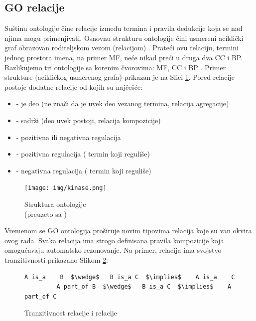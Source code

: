 \subsection{GO relacije}

Suštinu ontologije čine relacije između termina i pravila dedukcije koja se nad
njima mogu primenjivati. Osnovnu strukturu ontologije čini usmereni aciklički
graf  obrazovan roditeljskom vezom (relacijom) . Prateći
ovu relaciju, termini jednog prostora imena, na primer MF, neće nikad preći u
druga dva CC i BP. Razlikujemo tri ontologije sa korenim čvorovima:  MF, CC i BP
\parencite{go_struktura}. Primer strukture (acikličkog usmerenog grafa) prikazan je na
Slici \ref{fig:kinase}.  Pored relacije  postoje dodatne relacije od kojih
su najčešće:

\begin{itemize}
  \item {}  - je deo  (ne znači da je uvek deo vezanog termina, relacija agregacije)
  \item {} - sadrži (deo uvek postoji, relacija kompozicije)
  \item {} - pozitivna ili negativna regulacija
  \item {} - pozitivna regulacija  
    ( termin koji reguliše)
  \item {} - negativna regulacija 
    ( termin koji reguliše)
\end{itemize}

\begin{figure}[h!]
  \centering
  \texttt{[image: img/kinase.png]}
  \caption{Struktura ontologije\\ \footnotesize (preuzeto sa \parencite{go_veb})}
  \label{fig:kinase}
\end{figure}

Vremenom se GO ontologija proširuje novim tipovima relacija koje su van okvira ovog rada.
Svaka relacija ima strogo definisana pravila kompozicije koja omogućavaju
automatsko rezonovanje. Na primer, relacija  ima svojstvo
tranzitivnosti \parencite{is_a} prikazano Slikom \ref{fig:is_a}:
\lstset{
  basicstyle=\ttfamily, mathescape,
  numbers=none
}

\begin{figure}[h!]
  \centering
\begin{lstlisting}[basicstyle=\normalfont]
         A is_a    B  $\wedge$   B is_a C  $\implies$    A is_a    C           
         A part_of B  $\wedge$   B is_a C  $\implies$    A part_of C
\end{lstlisting}
\caption{Tranzitivnost relacije  i relacije }
  \label{fig:is_a}
\end{figure}


